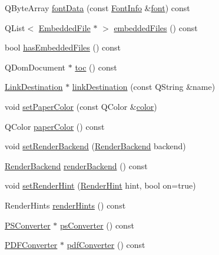 \begin{DoxyCompactItemize}
\item 
Q\+Byte\+Array \hyperlink{class_poppler_1_1_document_a5b4ce85bc240c703e45dfa94d6838ce5}{font\+Data} (const \hyperlink{class_poppler_1_1_font_info}{Font\+Info} \&\hyperlink{structfont}{font}) const
\item 
Q\+List$<$ \hyperlink{class_poppler_1_1_embedded_file}{Embedded\+File} $\ast$ $>$ \hyperlink{class_poppler_1_1_document_aab2376871d1323457d826747e53a2f00}{embedded\+Files} () const
\item 
bool \hyperlink{class_poppler_1_1_document_ab64db4502e26726709d7385cf06823ee}{has\+Embedded\+Files} () const
\item 
Q\+Dom\+Document $\ast$ \hyperlink{class_poppler_1_1_document_a3b622bb1d5a5c7f24a9baf8efc5d7b1f}{toc} () const
\item 
\hyperlink{class_poppler_1_1_link_destination}{Link\+Destination} $\ast$ \hyperlink{class_poppler_1_1_document_adce7c161b57d9d8a89888697da1d8c90}{link\+Destination} (const Q\+String \&name)
\item 
void \hyperlink{class_poppler_1_1_document_a4901da93d4deac9a263a219c33642176}{set\+Paper\+Color} (const Q\+Color \&\hyperlink{structcolor}{color})
\item 
Q\+Color \hyperlink{class_poppler_1_1_document_adb81a852324b3a581826c184f154d4ef}{paper\+Color} () const
\item 
void \hyperlink{class_poppler_1_1_document_a81a758f83530fa1cfaddf748c6be89c9}{set\+Render\+Backend} (\hyperlink{class_poppler_1_1_document_a4b0a8ab6b6f686c8802a0ad112d48247}{Render\+Backend} backend)
\item 
\hyperlink{class_poppler_1_1_document_a4b0a8ab6b6f686c8802a0ad112d48247}{Render\+Backend} \hyperlink{class_poppler_1_1_document_ae9aefd54aa4b72dc46bea2c114a02cbe}{render\+Backend} () const
\item 
void \hyperlink{class_poppler_1_1_document_a3f7655bb9e6893515bbc64b90b487ffc}{set\+Render\+Hint} (\hyperlink{class_poppler_1_1_document_a8420ce678235ee6214fbd91f5ae2f4e9}{Render\+Hint} hint, bool on=true)
\item 
Render\+Hints \hyperlink{class_poppler_1_1_document_a0dfc519e40d570461d26ce5b49e87466}{render\+Hints} () const
\item 
\hyperlink{class_poppler_1_1_p_s_converter}{P\+S\+Converter} $\ast$ \hyperlink{class_poppler_1_1_document_ab8c34ac2172d450753660bc7c31c82d7}{ps\+Converter} () const
\item 
\hyperlink{class_poppler_1_1_p_d_f_converter}{P\+D\+F\+Converter} $\ast$ \hyperlink{class_poppler_1_1_document_a1ba7a683fae5246efacedb7d82e4b997}{pdf\+Converter} () const

\end{DoxyCompactItemize}
